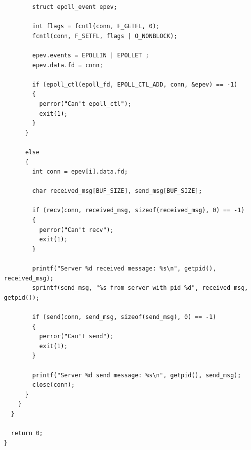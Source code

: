 \begin{lstlisting}
        struct epoll_event epev;

        int flags = fcntl(conn, F_GETFL, 0);
        fcntl(conn, F_SETFL, flags | O_NONBLOCK);

        epev.events = EPOLLIN | EPOLLET ;
        epev.data.fd = conn;

        if (epoll_ctl(epoll_fd, EPOLL_CTL_ADD, conn, &epev) == -1)
        {
          perror("Can't epoll_ctl");
          exit(1);
        }
      }

      else
      {
        int conn = epev[i].data.fd;

        char received_msg[BUF_SIZE], send_msg[BUF_SIZE];

        if (recv(conn, received_msg, sizeof(received_msg), 0) == -1)
        {
          perror("Can't recv");
          exit(1);
        }

        printf("Server %d received message: %s\n", getpid(), received_msg);
        sprintf(send_msg, "%s from server with pid %d", received_msg, getpid());

        if (send(conn, send_msg, sizeof(send_msg), 0) == -1)
        {
          perror("Can't send");
          exit(1);
        }

        printf("Server %d send message: %s\n", getpid(), send_msg);
        close(conn);
      }
    }
  }

  return 0;
}
\end{lstlisting}